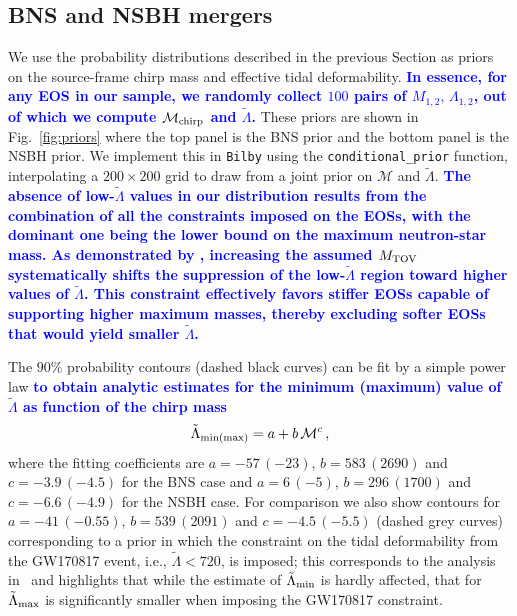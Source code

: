 \documentclass[twocolumn,linenumbers]{aastex631}
\newcommand{\blue}[1]{\textcolor{blue}{\textbf{#1}}}
\begin{document}
\subsection{BNS and NSBH mergers}

We use the probability distributions described in the previous Section as
priors on the source-frame chirp mass and effective tidal deformability.
\blue{In essence, for any EOS in our sample, we randomly collect $100$
  pairs of $M_{1,2},\,\Lambda_{1,2}$, out of which we compute
  $\mathcal{M}_{\rm chirp}$ and ${\tilde \Lambda}$.} These priors are
shown in Fig.~\ref{fig:priors} where the top panel is the BNS prior and
the bottom panel is the NSBH prior. We implement this in \texttt{Bilby}
using the \texttt{conditional\_prior} function, interpolating a
$200\times200$ grid to draw from a joint prior on $\mathcal{M}$ and
$\tilde{\Lambda}$.  \blue{ The absence of low-$\tilde{\Lambda}$ values in
  our distribution results from the combination of all the constraints
  imposed on the EOSs, with the dominant one being the lower bound on the
  maximum neutron-star mass. As demonstrated by \citet{Ecker:2022dlg},
  increasing the assumed $M_{\rm TOV}$ systematically shifts the
  suppression of the low-$\tilde{\Lambda}$ region toward higher values of
  $\tilde{\Lambda}$. This constraint effectively favors stiffer EOSs
  capable of supporting higher maximum masses, thereby excluding softer
  EOSs that would yield smaller $\tilde{\Lambda}$.}

The $90\%$ probability contours (dashed black curves) can be fit by a
simple power law \blue{to obtain analytic estimates for the minimum
  (maximum) value of $\tilde{\Lambda}$ as function of the chirp mass}
%
\begin{equation}\label{eq:fit}
  \tilde\Lambda_{{\rm min}(\rm max)}=a + b \,\mathcal{M}^c\,,
\end{equation}
%
where the fitting coefficients are $a=-57\,(-23)$, $b=583\,(2690)$ and
$c=-3.9\,(-4.5)$ for the BNS case and $a=6\,(-5)$, $b=296\,(1700)$ and
$c=-6.6\,(-4.9)$ for the NSBH case. For comparison we also show contours
for $a=-41\,(-0.55)$, $b=539\,(2091)$ and $c=-4.5\,(-5.5)$ (dashed grey
curves) corresponding to a prior in which the constraint on the tidal
deformability from the GW170817 event, i.e., $\tilde{\Lambda} < 720$, is
imposed; this corresponds to the analysis in~\citet{Altiparmak:2022} and
highlights that while the estimate of $\tilde\Lambda_{\rm min}$ is hardly
affected, that for $\tilde\Lambda_{\rm max}$ is significantly smaller
when imposing the GW170817 constraint.
\end{document}
